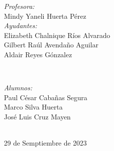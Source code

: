 \begin{titlepage}
    \vspace{10mm}
    \begin{minipage}{0.7\textwidth}
        \begin{flushleft} \large
            \emph{Profesora:}\\
                Mindy Yaneli Huerta Pérez \\
                \vspace{3mm}
                \emph{Ayudantes:}\\
                Elizabeth Chalnique Ríos Alvarado \\
                Gilbert Raúl Avendaño Aguilar \\
                Aldair Reyes Gónzalez
        \end{flushleft}
    \end{minipage}
    \\
    \vspace{20mm}
    \begin{minipage}{0.4\textwidth}
        \begin{flushright} \large
        \centering
            \emph{Alumnos:} \\ %
            \vspace{4mm}
            Paul César Cabañas Segura\\
            \vspace{3mm}
            Marco Silva Huerta \\                
            \vspace{3mm}        
            José Luis Cruz Mayen
        \end{flushright}
    \end{minipage}\\[1.6cm]
    \makeatother
    {\large 29 de Semptiembre de 2023}\\[2cm]
    \vfill 
    \end{titlepage}